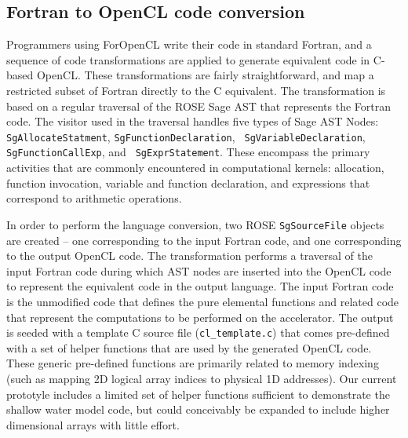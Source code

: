 \subsection{Fortran to OpenCL code conversion}

Programmers using ForOpenCL write their code in standard Fortran, and
a sequence of code transformations are applied to generate equivalent
code in C-based OpenCL.  These transformations are fairly
straightforward, and map a restricted subset of Fortran directly to
the C equivalent.  The transformation is based on a regular traversal
of the ROSE Sage AST that represents the Fortran code.  The visitor
used in the traversal handles five types of Sage AST Nodes: {\tt
  SgAllocateStatment}, {\tt SgFunctionDeclaration}, {\tt
  SgVariableDeclaration}, {\tt SgFunctionCallExp}, and {\tt
  SgExprStatement}.  These encompass the primary activities that are
commonly encountered in computational kernels: allocation, function
invocation, variable and function declaration, and expressions that
correspond to arithmetic operations.

In order to perform the language conversion, two ROSE {\tt SgSourceFile}
objects are created -- one corresponding to the input Fortran code, and
one corresponding to the output OpenCL code.  The transformation performs
a traversal of the input Fortran code during which AST nodes are inserted
into the OpenCL code to represent the equivalent code in the output language.
The input Fortran code is the unmodified code that defines the pure
elemental functions and related code that represent the computations to be
performed on the accelerator.  The output is seeded with a template C
source file ({\tt cl\_template.c}) that comes pre-defined with a set of
helper functions that are used by the generated OpenCL code.  These
generic pre-defined functions are primarily related to memory indexing (such
as mapping 2D logical array indices to physical 1D addresses).  Our current
prototyle includes a limited set of helper functions sufficient to demonstrate
the shallow water model code, but could conceivably be expanded to include
higher dimensional arrays with little effort.
